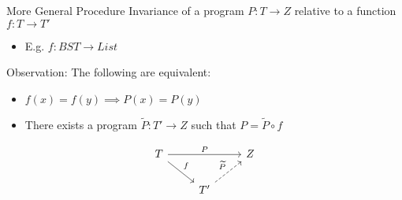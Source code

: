 \documentclass[usenames,dvipsnames]{beamer}
\newcommand{\e}{\emptyset}
\begin{document}
% 
% 

\begin{frame}[fragile]{More General Procedure}
  Invariance of a program $P : T\to Z$
  relative to a function $f : T \to T'$
  \begin{itemize}
    \item E.g. $f : BST \to List$
  \end{itemize}
  \vfill
  Observation:
  The following are equivalent:
  \begin{itemize}
    \item $f(x) = f(y) \implies P(x) = P(y)$
    \item There exists a program $\widetilde{P} : T'\to Z$
      such that $P = \widetilde{P} \circ f$
  \end{itemize}

  \[
    \begin{tikzcd}
      T \arrow{rr}{P} \arrow{rd}{f} &   & Z \\
      & T' \arrow[dashed]{ru}{\widetilde{P}} &   \\
    \end{tikzcd}
  \]
\end{frame}
\end{document}
